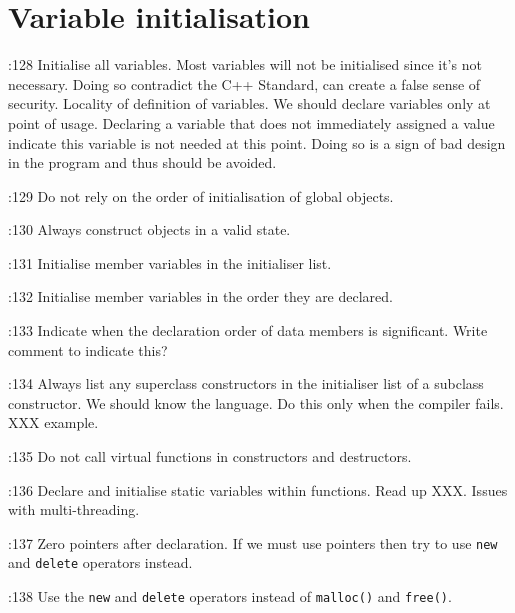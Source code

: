 \documentclass{book}
\newcommand{\name}[1]{\texttt{#1}}
\begin{document}
\section{Variable initialisation}
\label{sec:VarInitialisation}

\cite{OKL_MisfeldtBumgardnerGray2004CppStyle}:128 Initialise all variables. Most variables will not be initialised since it's not necessary. Doing so contradict the C++ Standard, can create a false sense of security. Locality of definition of variables. We should declare variables only at point of usage. Declaring a variable that does not immediately assigned a value indicate this variable is not needed at this point. Doing so is a sign of bad design in the program and thus should be avoided.      

\cite{OKL_MisfeldtBumgardnerGray2004CppStyle}:129 Do not rely on the order of initialisation of global objects. 

\cite{OKL_MisfeldtBumgardnerGray2004CppStyle}:130 Always construct objects in a valid state. 

\cite{OKL_MisfeldtBumgardnerGray2004CppStyle}:131 Initialise member variables in the initialiser list. 

\cite{OKL_MisfeldtBumgardnerGray2004CppStyle}:132 Initialise member variables in the order they are declared.

\cite{OKL_MisfeldtBumgardnerGray2004CppStyle}:133 Indicate when the declaration order of data members is significant. Write comment to indicate this?

\cite{OKL_MisfeldtBumgardnerGray2004CppStyle}:134 Always list any superclass constructors in the initialiser list of a subclass constructor. We should know the language. Do this only when the compiler fails. XXX example.

\cite{OKL_MisfeldtBumgardnerGray2004CppStyle}:135 Do not call virtual functions in constructors and destructors.

\cite{OKL_MisfeldtBumgardnerGray2004CppStyle}:136 Declare and initialise static variables within functions. Read up XXX. Issues with multi-threading.

\cite{OKL_MisfeldtBumgardnerGray2004CppStyle}:137 Zero pointers after declaration. If we must use pointers then try to use \name{new} and \name{delete} operators instead.

\cite{OKL_MisfeldtBumgardnerGray2004CppStyle}:138 Use the \name{new} and \name{delete} operators instead of \name{malloc()} and \name{free()}. 
\end{document}
